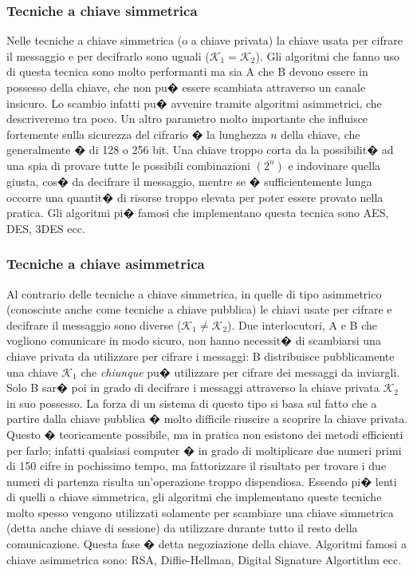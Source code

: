 \subsubsection{Tecniche a chiave simmetrica}

Nelle tecniche a chiave simmetrica (o a chiave privata) la chiave usata per cifrare il messaggio e per decifrarlo sono uguali ($\mathcal{K}_{1}=\mathcal{K}_{2}$). Gli algoritmi che fanno uso di questa tecnica sono molto performanti ma sia A che B devono essere in possesso della chiave, che non pu� essere scambiata attraverso un canale insicuro. Lo scambio infatti pu� avvenire tramite algoritmi asimmetrici, che descriveremo tra poco. Un altro parametro molto importante che influisce fortemente sulla sicurezza del cifrario � la lunghezza $n$ della chiave, che generalmente � di 128 o 256 bit. Una chiave troppo corta da la possibilit� ad una spia di provare tutte le possibili combinazioni $(2^n)$ e indovinare quella giusta, cos� da decifrare il messaggio, mentre se � sufficientemente lunga occorre una quantit� di risorse troppo elevata per poter essere provato nella pratica. Gli algoritmi pi� famosi che implementano questa tecnica sono AES, DES, 3DES ecc.

\subsubsection{Tecniche a chiave asimmetrica}
Al contrario delle tecniche a chiave simmetrica, in quelle di tipo asimmetrico (conosciute anche come tecniche a chiave pubblica) le chiavi usate per cifrare e decifrare il messaggio sono diverse ($\mathcal{K}_{1}\ne \mathcal{K}_{2}$). Due interlocutori, A e B che vogliono comunicare in modo sicuro, non hanno necessit� di scambiarsi una chiave privata da utilizzare per cifrare i messaggi: B distribuisce pubblicamente una chiave $\mathcal{K}_{1}$ che \emph{chiunque} pu� utilizzare per cifrare dei messaggi da inviargli. Solo B sar� poi in grado di decifrare i messaggi attraverso la chiave privata $\mathcal{K}_{2}$ in suo possesso. La forza di un sistema di questo tipo si basa sul fatto che a partire dalla chiave pubblica � molto difficile riuscire a scoprire la chiave privata. Questo � teoricamente possibile, ma in pratica non esistono dei metodi efficienti per farlo; infatti qualsiasi computer � in grado di moltiplicare due numeri primi di 150 cifre in pochissimo tempo, ma fattorizzare il risultato per trovare i due numeri di partenza risulta un'operazione troppo dispendiosa.
Essendo pi� lenti di quelli a chiave simmetrica, gli algoritmi che implementano queste tecniche molto spesso vengono utilizzati solamente per scambiare una chiave simmetrica (detta anche chiave di sessione) da utilizzare durante tutto il resto della comunicazione. Questa fase � detta negoziazione della chiave. Algoritmi famosi a chiave asimmetrica sono: RSA, Diffie-Hellman, Digital Signature Algortithm ecc.

